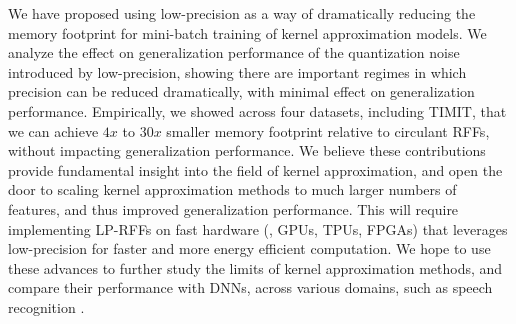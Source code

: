 We have proposed using low-precision as a way of dramatically reducing the memory footprint for mini-batch training of kernel approximation models.  We analyze the effect on generalization performance of the quantization noise introduced by low-precision, showing there are important regimes in which precision can be reduced dramatically, with minimal effect on generalization performance.  Empirically, we showed across four datasets, including TIMIT, that we can achieve $4x$ to $30x$ smaller memory footprint relative to circulant RFFs, without impacting generalization performance.  We believe these contributions provide fundamental insight into the field of kernel approximation, and open the door to scaling kernel approximation methods to much larger numbers of features, and thus improved generalization performance. This will require implementing LP-RFFs on fast hardware (\eg, GPUs, TPUs, FPGAs) that leverages low-precision for faster and more energy efficient computation.  We hope to use these advances to further study the limits of kernel approximation methods, and compare their performance with DNNs, across various domains, such as speech recognition \citep{may2017}.